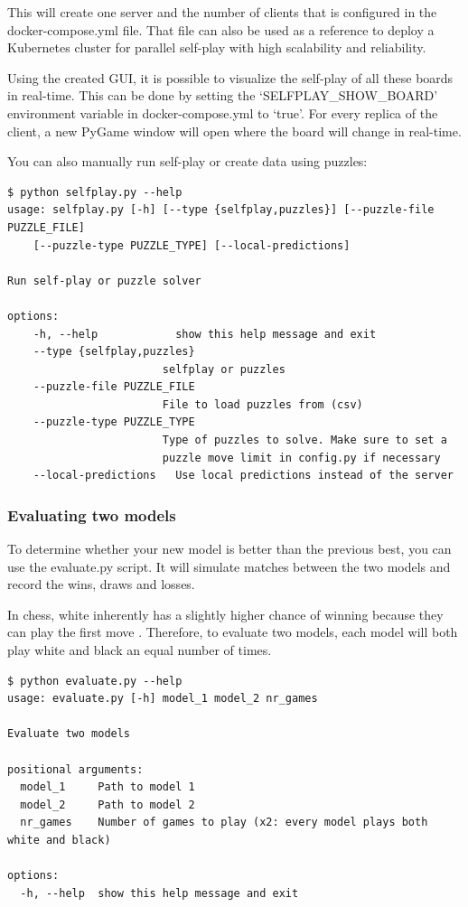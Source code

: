 \documentclass{article}
\begin{document}
This will create one server and the number of clients that is configured in the docker-compose.yml file.
That file can also be used as a reference to deploy a Kubernetes cluster for parallel self-play with 
high scalability and reliability. 

Using the created GUI, it is possible to visualize the self-play of all these boards in real-time.
This can be done by setting the `SELFPLAY\_SHOW\_BOARD' environment variable in docker-compose.yml to `true'.
For every replica of the client, a new PyGame window will open where the board will change in real-time. 

You can also manually run self-play or create data using puzzles:

\begin{verbatim}
$ python selfplay.py --help
usage: selfplay.py [-h] [--type {selfplay,puzzles}] [--puzzle-file PUZZLE_FILE] 
    [--puzzle-type PUZZLE_TYPE] [--local-predictions]

Run self-play or puzzle solver

options:
    -h, --help            show this help message and exit
    --type {selfplay,puzzles}
                        selfplay or puzzles
    --puzzle-file PUZZLE_FILE
                        File to load puzzles from (csv)
    --puzzle-type PUZZLE_TYPE
                        Type of puzzles to solve. Make sure to set a 
                        puzzle move limit in config.py if necessary
    --local-predictions   Use local predictions instead of the server
\end{verbatim}

\subsubsection{Evaluating two models}

To determine whether your new model is better than the previous best, you can use the evaluate.py script.
It will simulate matches between the two models and record the wins, draws and losses.

In chess, white inherently has a slightly higher chance of winning because they can play the first move \cite{FirstmoveAdvantageChess2022}.
Therefore, to evaluate two models, each model will both play white and black an equal number of times.

\begin{verbatim}
$ python evaluate.py --help
usage: evaluate.py [-h] model_1 model_2 nr_games

Evaluate two models

positional arguments:
  model_1     Path to model 1
  model_2     Path to model 2
  nr_games    Number of games to play (x2: every model plays both white and black)

options:
  -h, --help  show this help message and exit
\end{verbatim}
\end{document}
